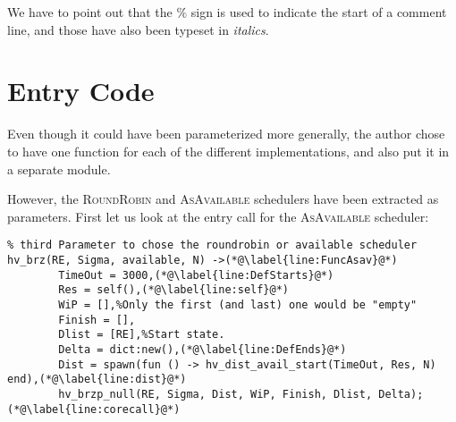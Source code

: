 We have to point out that the $\%$ sign is used to indicate the start
of a comment line, and those have also been typeset in \emph{italics}.

\section{Entry Code}

Even though it could have been parameterized more generally, the author
chose to have one function for each of the different implementations,
and also put it in a separate module.

However, the \textsc{RoundRobin} and \textsc{AsAvailable} schedulers have been extracted
as parameters. First let us look at the entry call for the \textsc{AsAvailable} scheduler:
\begin{lstlisting}[name=hvp2]
%The entry to hvp2
% third Parameter to chose the roundrobin or available scheduler
hv_brz(RE, Sigma, available, N) ->(*@\label{line:FuncAsav}@*)
		TimeOut = 3000,(*@\label{line:DefStarts}@*)
		Res = self(),(*@\label{line:self}@*)
		WiP = [],%Only the first (and last) one would be "empty"
		Finish = [],
		Dlist = [RE],%Start state.
		Delta = dict:new(),(*@\label{line:DefEnds}@*)
		Dist = spawn(fun () -> hv_dist_avail_start(TimeOut, Res, N)		 end),(*@\label{line:dist}@*)
		hv_brzp_null(RE, Sigma, Dist, WiP, Finish, Dlist, Delta); (*@\label{line:corecall}@*)
\end{lstlisting}


